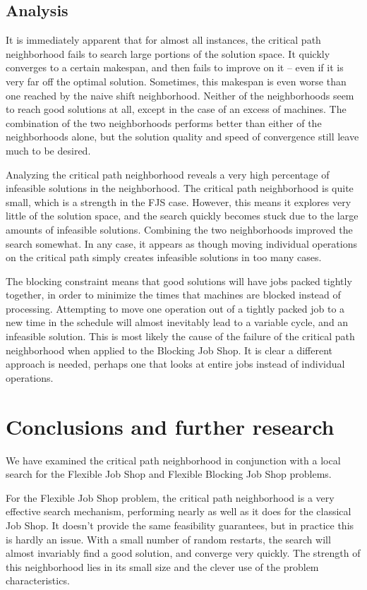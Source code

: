 \documentclass[a4paper,11pt]{article}
\begin{document}
\subsection{Analysis}

It is immediately apparent that for almost all instances, the critical path neighborhood fails to search large portions of the solution space. It quickly converges to a certain makespan, and then fails to improve on it -- even if it is very far off the optimal solution. Sometimes, this makespan is even worse than one reached by the naive shift neighborhood. Neither of the neighborhoods seem to reach good solutions at all, except in the case of an excess of machines. The combination of the two neighborhoods performs better than either of the neighborhoods alone, but the solution quality and speed of convergence still leave much to be desired.

Analyzing the critical path neighborhood reveals a very high percentage of infeasible solutions in the neighborhood. The critical path neighborhood is quite small, which is a strength in the FJS case. However, this means it explores very little of the solution space, and the search quickly becomes stuck due to the large amounts of infeasible solutions. Combining the two neighborhoods improved the search somewhat. In any case, it appears as though moving individual operations on the critical path simply creates infeasible solutions in too many cases.

The blocking constraint means that good solutions will have jobs packed tightly together, in order to minimize the times that machines are blocked instead of processing. Attempting to move one operation out of a tightly packed job to a new time in the schedule will almost inevitably lead to a variable cycle, and an infeasible solution. This is most likely the cause of the failure of the critical path neighborhood when applied to the Blocking Job Shop. It is clear a different approach is needed, perhaps one that looks at entire jobs instead of individual operations.

\section{Conclusions and further research}

We have examined the critical path neighborhood in conjunction with a local search for the Flexible Job Shop and Flexible Blocking Job Shop problems.

For the Flexible Job Shop problem, the critical path neighborhood is a very effective search mechanism, performing nearly as well as it does for the classical Job Shop. It doesn't provide the same feasibility guarantees, but in practice this is hardly an issue. With a small number of random restarts, the search will almost invariably find a good solution, and converge very quickly. The strength of this neighborhood lies in its small size and the clever use of the problem characteristics.
\end{document}
